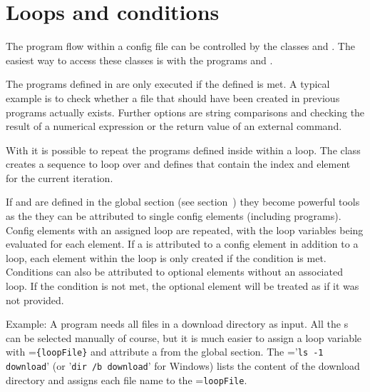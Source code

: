 \section{Loops and conditions}\label{general.loopsAndConditions}
The program flow within a config file can be controlled by the classes 
and . The easiest way to access these classes is with the programs
 and .

The programs defined in  are only executed if the defined
 is met. A typical example is to check whether a file that
should have been created in previous programs actually exists. Further options are string comparisons and
checking the result of a numerical expression or the return value of an external command.

With  it is possible to repeat the programs defined inside within a loop.
The class  creates a sequence to loop over and defines 
that contain the index and element for the current iteration.

If  and  are defined in the global
section (see section~) they become powerful tools as the
they can be attributed to single config elements (including programs).
Config elements with an assigned loop are repeated, with the loop variables being evaluated for each element.
If a  is attributed to a config element in addition to a loop, each element within the loop
is only created if the condition is met. Conditions can also be attributed to optional elements without an associated loop.
If the condition is not met, the optional element will be treated as if it was not provided.

Example: A program needs all files in a download directory as input.
All the s can be selected manually of course, but it is much easier to assign
a loop variable with =\verb|{loopFile}| and attribute a
 from the global section.
The ='\verb|ls -1 download|' (or '\verb|dir /b download|' for Windows)
lists the content of the download directory and assigns each file name to the
=\verb|loopFile|.
